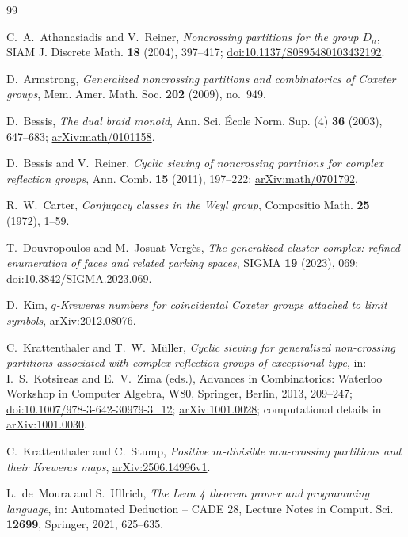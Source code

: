 \documentclass[11pt]{article}
\theoremstyle{definition}
\begin{document}
\begin{thebibliography}{99}

C.~A.~Athanasiadis and V.~Reiner, \emph{Noncrossing partitions for the
group $D_n$}, SIAM J. Discrete Math. \textbf{18} (2004), 397--417;
\href{https://doi.org/10.1137/S0895480103432192}{doi:10.1137/S0895480103432192}.

D.~Armstrong, \emph{Generalized noncrossing partitions and combinatorics of
Coxeter groups}, Mem. Amer. Math. Soc. \textbf{202} (2009), no.~949.

D.~Bessis, \emph{The dual braid monoid}, Ann. Sci. École Norm. Sup. (4)
\textbf{36} (2003), 647--683;
\href{https://arxiv.org/abs/math/0101158}{arXiv:math/0101158}.

D.~Bessis and V.~Reiner, \emph{Cyclic sieving of noncrossing partitions for
complex reflection groups}, Ann. Comb. \textbf{15} (2011), 197--222;
\href{https://arxiv.org/abs/math/0701792}{arXiv:math/0701792}.

R.~W.~Carter, \emph{Conjugacy classes in the Weyl group}, Compositio Math.
\textbf{25} (1972), 1--59.

T.~Douvropoulos and M.~Josuat-Vergès, \emph{The generalized cluster complex:
refined enumeration of faces and related parking spaces}, SIGMA \textbf{19}
(2023), 069; \href{https://doi.org/10.3842/SIGMA.2023.069}{doi:10.3842/SIGMA.2023.069}.

D.~Kim, \emph{$q$-Kreweras numbers for coincidental Coxeter groups attached
to limit symbols}, \href{https://arxiv.org/abs/2012.08076}{arXiv:2012.08076}.

C.~Krattenthaler and T.~W.~Müller, \emph{Cyclic sieving for generalised
non-crossing partitions associated with complex reflection groups of
exceptional type}, in: I.~S.~Kotsireas and E.~V.~Zima (eds.), Advances in
Combinatorics: Waterloo Workshop in Computer Algebra, W80, Springer, Berlin,
2013, 209--247;
\href{https://doi.org/10.1007/978-3-642-30979-3_12}{doi:10.1007/978-3-642-30979-3\_12};
\href{https://arxiv.org/abs/1001.0028}{arXiv:1001.0028}; computational
details in \href{https://arxiv.org/abs/1001.0030}{arXiv:1001.0030}.

C.~Krattenthaler and C.~Stump, \emph{Positive $m$-divisible non-crossing
partitions and their Kreweras maps},
\href{https://arxiv.org/abs/2506.14996v1}{arXiv:2506.14996v1}.

L.~de~Moura and S.~Ullrich, \emph{The Lean 4 theorem prover and programming
language}, in: Automated Deduction -- CADE 28, Lecture Notes in Comput. Sci.
\textbf{12699}, Springer, 2021, 625--635.


\end{thebibliography}
\end{document}
